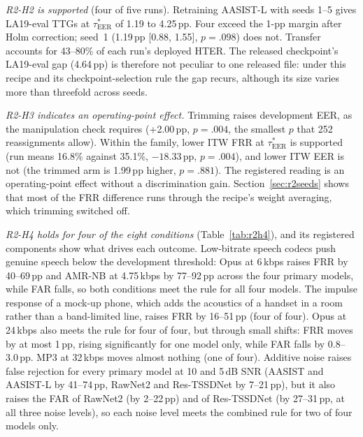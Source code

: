 \documentclass[review,authoryear]{elsarticle}
\newcommand{\tauE}{\tau^{*}_{\mathrm{EER}}}
\begin{document}
\emph{R2-H2 is supported} (four of five runs). Retraining AASIST-L with seeds 1--5 gives LA19-eval TTGs at \(\tauE\) of
1.19 to 4.25\,pp. Four exceed the 1-pp margin after Holm correction; seed~1 (1.19\,pp [0.88, 1.55], \(p=.098\)) does
not. Transfer accounts for 43--80\% of each run's deployed HTER. The released checkpoint's LA19-eval gap (4.64\,pp) is
therefore not peculiar to one released file: under this recipe and its checkpoint-selection rule the gap recurs,
although its size varies more than threefold across seeds.

\emph{R2-H3 indicates an operating-point effect.} Trimming raises development EER, as the manipulation check requires
(+2.00\,pp, \(p=.004\), the smallest \(p\) that 252 reassignments allow). Within the family, lower ITW FRR at \(\tauE\)
is supported (run means 16.8\% against 35.1\%, \(-18.33\)\,pp, \(p=.004\)), and lower ITW EER is not (the trimmed arm
is 1.99\,pp higher, \(p=.881\)). The registered reading is an operating-point effect without a discrimination gain.
Section~\ref{sec:r2seeds} shows that most of the FRR difference runs through the recipe's weight averaging, which
trimming switched off.

\emph{R2-H4 holds for four of the eight conditions} (Table~\ref{tab:r2h4}), and its registered components show what
drives each outcome. Low-bitrate speech codecs push genuine speech below the development threshold: Opus at 6\,kbps
raises FRR by 40--69\,pp and AMR-NB at 4.75\,kbps by 77--92\,pp across the four primary models, while FAR falls, so both
conditions meet the rule for all four models. The impulse response of a mock-up phone, which adds the acoustics of a
handset in a room rather than a band-limited line, raises FRR by 16--51\,pp (four of four). Opus at 24\,kbps also meets
the rule for four of four, but through small shifts: FRR moves by at most 1\,pp, rising significantly for one model only,
while FAR falls by 0.8--3.0\,pp. MP3 at 32\,kbps moves almost nothing (one of four). Additive noise raises false rejection
for every primary model at 10 and 5\,dB SNR (AASIST and AASIST-L by 41--74\,pp, RawNet2 and Res-TSSDNet by 7--21\,pp), but
it also raises the FAR of RawNet2 (by 2--22\,pp) and of Res-TSSDNet (by 27--31\,pp, at all three noise levels), so each
noise level meets the combined rule for two of four models only.
\end{document}
